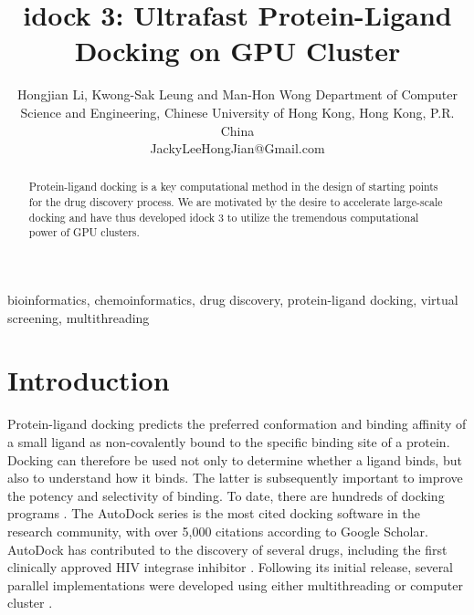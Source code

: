 \documentclass[10pt, conference, compsocconf]{../IEEEtran}
\begin{document}
\title{idock 3: Ultrafast Protein-Ligand Docking on GPU Cluster} %
\author
{
\IEEEauthorblockN
{
Hongjian Li, Kwong-Sak Leung and Man-Hon Wong
\IEEEauthorblockA
{
Department of Computer Science and Engineering, Chinese University of Hong Kong, Hong Kong, P.R. China\\
JackyLeeHongJian@Gmail.com
}
}
}
\maketitle

\begin{abstract}

Protein-ligand docking is a key computational method in the design of starting points for the drug discovery process. We are motivated by the desire to accelerate large-scale docking and have thus developed idock 3 to utilize the tremendous computational power of GPU clusters.

\end{abstract}

\begin{IEEEkeywords}

bioinformatics, chemoinformatics, drug discovery, protein-ligand docking, virtual screening, multithreading

\end{IEEEkeywords}

\section{Introduction}

Protein-ligand docking predicts the preferred conformation and binding affinity of a small ligand as non-covalently bound to the specific binding site of a protein. Docking can therefore be used not only to determine whether a ligand binds, but also to understand how it binds. The latter is subsequently important to improve the potency and selectivity of binding. To date, there are hundreds of docking programs \cite{493,922}. The AutoDock series \cite{597,596,595} is the most cited docking software in the research community, with over 5,000 citations according to Google Scholar. AutoDock has contributed to the discovery of several drugs, including the first clinically approved HIV integrase inhibitor \cite{1169}. Following its initial release, several parallel implementations were developed using either multithreading or computer cluster \cite{115,560,782}.
\end{document}
